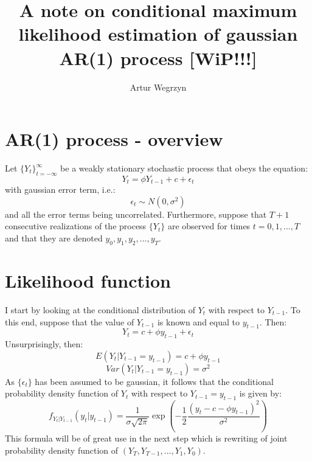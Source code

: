 \documentclass[12pt]{article}
\begin{document}
\title{A note on conditional maximum likelihood estimation of gaussian AR(1) process [WiP!!!]}
\author{Artur Wegrzyn}
\maketitle


\section{AR(1) process - overview}
Let $\{Y_t\}_{t=-\infty}^{\infty}$ be a weakly stationary stochastic process that obeys the equation:
\begin{equation}
Y_t = \phi Y_{t-1} + c + \epsilon_t
\end{equation}
with gaussian error term, i.e.:
\begin{equation}
\epsilon_t \sim N(0, \sigma^2)
\end{equation}
and all the error terms being uncorrelated. Furthermore, suppose that $T+1$ consecutive 
realizations of the process $\{Y_t\}$ are observed for times $t = 0, 1, ..., T$ and that
 they are denoted $y_0, y_1, y_2, ..., y_T$. \\
 

\section{Likelihood function}
I start by looking at the conditional distribution of $Y_t$ with respect to $Y_{t-1}$. 
To this end, suppose that the value of $Y_{t-1}$ is known and equal to $y_{t-1}$. Then:
\begin{equation*}
Y_t = c + \phi y_{t-1} + \epsilon_t
\end{equation*}
Unsurprisingly, then:
$$ E(Y_t | Y_{t-1} = y_{t-1}) = c + \phi y_{t-1} $$
$$Var(Y_t | Y_{t-1} = y_{t-1}) = \sigma^2 $$
As $\{\epsilon_t\}$ has been assumed to be gaussian, it follows that the conditional 
probability density function of $Y_t$ with respect to $Y_{t-1} = y_{t-1}$ is given by:
\begin{equation}
\label{ar_cond_density}
f_{Y_t | Y_{t-1}}(y_t | y_{t-1}) = \frac{1}{\sigma \sqrt{2 \pi}}
\exp \left( - \frac{1}{2} \frac{(y_t - c - \phi y_{t-1})^2}{\sigma^2} \right)
\end{equation}
This formula will be of great use in the next step which is rewriting of joint 
probability density function of $(Y_T, Y_{T-1}, ..., Y_1, Y_0)$. 
\end{document}
